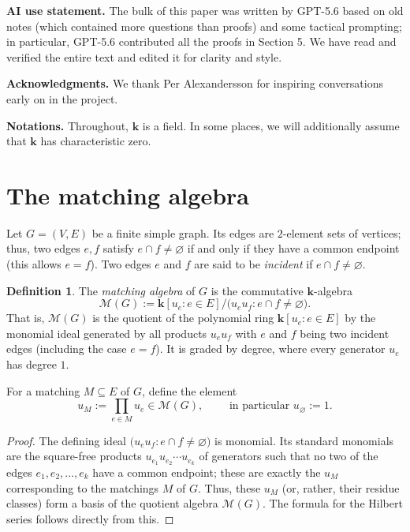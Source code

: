 \documentclass[12pt]{amsart}
\newtheorem{proposition}[theorem]{Proposition}
\theoremstyle{definition}
\newtheorem{definition}[theorem]{Definition}
\theoremstyle{remark}
\newcommand{\kk}{\mathbf{k}}
\newcommand{\Hilb}{\operatorname{Hilb}}
\begin{document}
\medskip
\textbf{AI use statement.}
The bulk of this paper was written by GPT-5.6 based on old notes
(which contained more questions than proofs) and some tactical prompting;
in particular, GPT-5.6 contributed all the proofs in Section 5.
We have read and verified the entire text and edited it for
clarity and style.

\medskip
\textbf{Acknowledgments.}
We thank Per Alexandersson for inspiring conversations early on in the
project.

\medskip
\textbf{Notations.}
Throughout, $\kk$ is a field.
In some places, we will additionally assume that $\kk$ has characteristic zero.


\section{The matching algebra}

Let $G = (V, E)$ be a finite simple graph.
Its edges are $2$-element sets of vertices;
thus, two edges $e,f$ satisfy $e\cap f \ne\varnothing$
if and only if they have a common endpoint (this allows $e=f$).
Two edges $e$ and $f$ are said to be \emph{incident} if
$e\cap f \ne\varnothing$.

\begin{definition}
The \emph{matching algebra} of $G$ is the commutative $\kk$-algebra
\[
 \mathcal M(G):=
 \kk[u_e:e\in E]/\bigl(u_eu_f:e\cap f\ne\varnothing\bigr).
\]
That is, $\mathcal M(G)$ is the quotient of the polynomial ring
$\kk[u_e:e\in E]$ by the monomial ideal generated by all products
$u_eu_f$ with $e$ and $f$ being two incident edges
(including the case $e=f$).
It is graded by degree, where every generator $u_e$ has degree $1$.
\end{definition}

For a matching $M\subseteq E$ of $G$, define the element
\[
 u_M:=\prod_{e\in M}u_e \in \mathcal M(G),
 \qquad \text{ in particular }
 u_\varnothing:=1.
\]


\begin{proof}
The defining ideal $\bigl(u_eu_f:e\cap f\ne\varnothing\bigr)$ is monomial.
Its standard monomials are the square-free
products $u_{e_1} u_{e_2} \cdots u_{e_k}$ of generators
such that no two of the edges $e_1, e_2, \ldots, e_k$ have
a common endpoint; these are exactly the $u_M$
corresponding to the matchings $M$ of $G$.
Thus, these $u_M$ (or, rather, their residue classes) form
a basis of the quotient algebra $\mathcal M(G)$.
The formula for the Hilbert series follows directly from this.
\end{proof}
\end{document}

